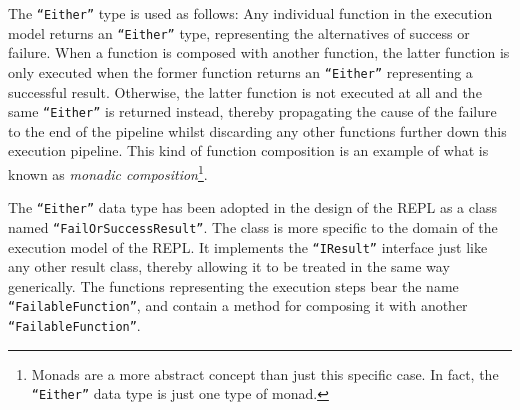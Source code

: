 The \texttt{``Either''} type is used as follows: Any individual function in the
execution model returns an \texttt{``Either''} type, representing the
alternatives of success or failure. When a function is composed with
another function, the latter function is only executed when the former
function returns an \texttt{``Either''} representing a successful
result. Otherwise, the latter function is not
executed at all and the same \texttt{``Either''} is returned instead, thereby
propagating the cause of the failure to the end of the pipeline whilst
discarding any other functions further down this execution pipeline.
This kind of function composition is an example of what is known as \textit{monadic
  composition}\footnote{Monads are a more abstract concept than just
  this specific case. In fact, the \texttt{``Either''} data type is just one
  type of monad.}.

The \texttt{``Either''} data type has been adopted in the design of the REPL as
a class named \texttt{``FailOrSuccessResult''}. The class is more specific to
the domain of the execution model of the REPL. It implements the
\texttt{``IResult''} interface just like any other result class, thereby
allowing it to be treated in the same way generically. The functions
representing the execution steps bear the name \texttt{``FailableFunction''},
and contain a method for composing it with another
\texttt{``FailableFunction''}.

